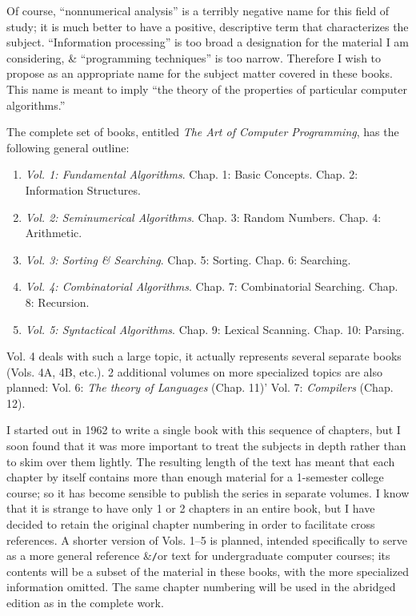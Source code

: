 \documentclass{article}
\begin{document}
Of course, ``nonnumerical analysis'' is a terribly negative name for this field of study; it is much better to have a positive, descriptive term that characterizes the subject. ``Information processing'' is too broad a designation for the material I am considering, \& ``programming techniques'' is too narrow. Therefore I wish to propose  as an appropriate name for the subject matter covered in these books. This name is meant to imply ``the theory of the properties of particular computer algorithms.''

The complete set of books, entitled {\it The Art of Computer Programming}, has the following general outline:
\begin{enumerate}
	\item {\it Vol. 1: Fundamental Algorithms}. Chap. 1: Basic Concepts. Chap. 2: Information Structures.
	\item {\it Vol. 2: Seminumerical Algorithms}. Chap. 3: Random Numbers. Chap. 4: Arithmetic.
	\item {\it Vol. 3: Sorting \& Searching}. Chap. 5: Sorting. Chap. 6: Searching.
	\item {\it Vol. 4: Combinatorial Algorithms}. Chap. 7: Combinatorial Searching. Chap. 8: Recursion.
	\item {\it Vol. 5: Syntactical Algorithms}. Chap. 9: Lexical Scanning. Chap. 10: Parsing.
\end{enumerate}
Vol. 4 deals with such a large topic, it actually represents several separate books (Vols. 4A, 4B, etc.). 2 additional volumes on more specialized topics are also planned: Vol. 6: {\it The theory of Languages} (Chap. 11)' Vol. 7: {\it Compilers} (Chap. 12).

I started out in 1962 to write a single book with this sequence of chapters, but I soon found that it was more important to treat the subjects in depth rather than to skim over them lightly. The resulting length of the text has meant that each chapter by itself contains more than enough material for a 1-semester college course; so it has become sensible to publish the series in separate volumes. I know that it is strange to have only 1 or 2 chapters in an entire book, but I have decided to retain the original chapter numbering in order to facilitate cross references. A shorter version of Vols. 1--5 is planned, intended specifically to serve as a more general reference \&{\tt/}or text for undergraduate computer courses; its contents will be a subset of the material in these books, with the more specialized information omitted. The same chapter numbering will be used in the abridged edition as in the complete work.
\end{document}
